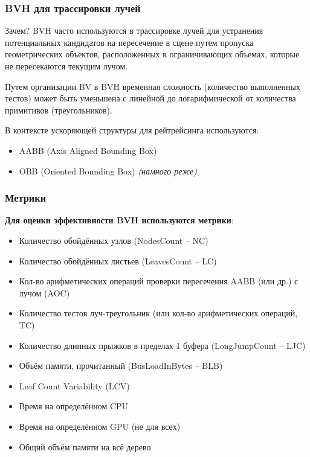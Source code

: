 \documentclass{beamer}
\begin{document}
\begin{frame}
    \frametitle{BVH для трассировки лучей}
    \begin{block}{Зачем?}
        BVH часто используются в трассировке лучей для устранения потенциальных кандидатов
        на пересечение в сцене путем пропуска геометрических объектов,
        расположенных в ограничивающих объемах,
        которые не пересекаются текущим лучом.
    \end{block}
    Путем организации BV в BVH временная сложность (количество выполненных тестов)
    может быть уменьшена с линейной до логарифмической от количества примитивов (треугольников).

    В контексте ускоряющей структуры для рейтрейсинга используются:
    \begin{itemize}
        \item
            AABB (Axis Aligned Bounding Box)
        \item
            OBB (Oriented Bounding Box) \textit{(намного реже)}
    \end{itemize}


\end{frame}

\begin{frame}
    \frametitle{Метрики}
    \textbf{Для оценки эффективности BVH используются метрики}:
    \begin{itemize}
        \item
            Количество обойдённых узлов (NodesCount – NC)
        \item
            Количество обойдённых листьев (LeavesCount – LC)
        \item
            Кол-во арифметических операций проверки пересечения AABB (или др.) с лучом (AOC)
        \item
            Количество тестов луч-треугольник (или кол-во арифметических операций, TC)
        \item
            Количество длинных прыжков в пределах 1 буфера (LongJumpCount – LJC)
        \item
            Объём памяти, прочитанный (BusLoadInBytes – BLB)
        \item
            Leaf Count Variability (LCV)
        \item
            Время на определённом CPU
        \item
            Время на определённом GPU (не для всех)
        \item
            Общий объём памяти на всё дерево
    \end{itemize}
\end{frame}
\end{document}

